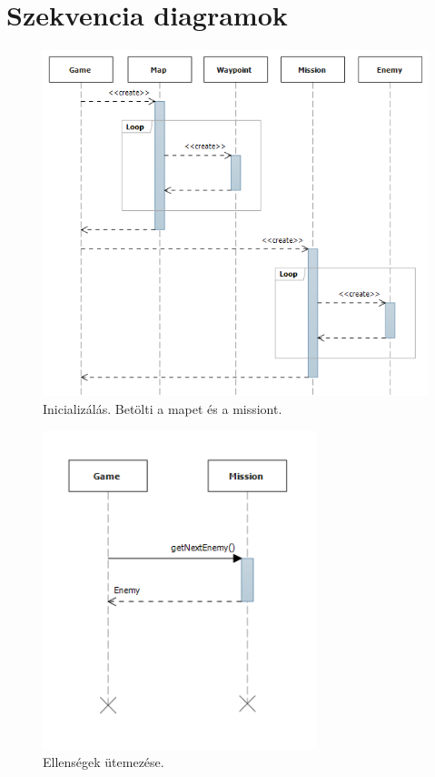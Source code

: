 \section{Szekvencia diagramok}

\begin{figure}[H]
\begin{center}
\includegraphics[width=15cm]{images/ch04/init.png}
\caption{Inicializálás. Betölti a mapet és a missiont.}
\label{fig:starting_game}
\end{center}
\end{figure}

\begin{figure}[H]
\begin{center}
\includegraphics[width=8cm]{images/scheduling_enemies.png}
\caption{Ellenségek ütemezése.}
\label{fig:scheduling_enemies}
\end{center}
\end{figure}

